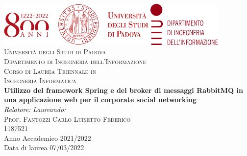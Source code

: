 \documentclass[a4paper,12pt]{book}
\begin{document}
\begin{titlepage}
\begin{center}
\includegraphics[height=2.22cm]{images/unipd_800_logotipo_sigillo.pdf}  \hfill \includegraphics[height=2.22cm]{images/dei_sigillo_logotipe.pdf}  \\

\vspace{2cm}
\textsc{\LARGE Università degli Studi di Padova}\\
\vspace{0.45cm}
\textsc{\large Dipartimento di Ingegneria dell'Informazione}\\
\vspace{0.4cm}
\textsc{\large Corso di Laurea Triennale in}\\
\textsc{\large Ingegneria Informatica}\\
\vfill
{ \LARGE \bfseries Utilizzo del framework Spring e del broker di messaggi RabbitMQ in una applicazione web per il corporate social networking}\\
\vfill
\textit{\large Relatore:} \hfill \textit{\large Laureando:}\\
\textsc{\large Prof. Fantozzi Carlo} \hfill \textsc{Luisetto Federico}\\
\hfill \textsc{1187521}\\

\vfill
{\large Anno Accademico 2021/2022}\\
{\large Data di laurea 07/03/2022}
\end{center}
\end{titlepage}


\thispagestyle{empty} %
\cleardoublepage

\thispagestyle{empty}
\end{document}
